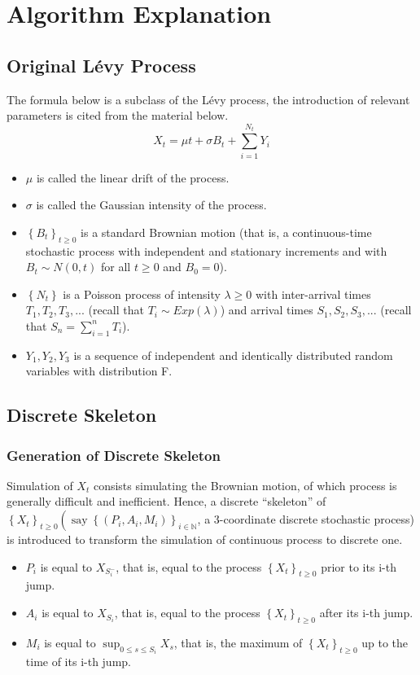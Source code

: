 \section{Algorithm Explanation}

\subsection{Original Lévy Process}
The formula below is a subclass of the Lévy process, the introduction of relevant parameters is cited from the material \cite{Brownian} below.
$$
X_{t}=\mu t+\sigma B_{t}+\sum_{i=1}^{N_{t}} Y_{i}
$$

\begin{itemize}
    \item $\mu$ is called the linear drift of the process.
    \item $\sigma$ is called the Gaussian intensity of the process.
    \item $\left\{B_{t}\right\}_{t \geq 0}$ is a standard Brownian motion (that is, a continuous-time stochastic process with independent and stationary increments and with $B_{t} \sim N(0, t)$ for all $t \geq 0$ and $B_{0}=0$).
    \item $\left\{N_{t}\right\}$ is a Poisson process of intensity $\lambda \geq 0$ with inter-arrival times $T_{1}, T_{2}, T_{3}, ...$ (recall that $T_{i} \sim E x p(\lambda)$) and arrival times $S_{1}, S_{2}, S_{3}, ...$ (recall that $S_{n} = \sum_{i=1}^{n} T_{i}$).
    \item $Y_{1}, Y_{2}, Y_{3}$ is a sequence of independent and identically distributed random variables with distribution F. 
\end{itemize}
\vspace{0.2cm}


\subsection{Discrete Skeleton}
\subsubsection{Generation of Discrete Skeleton}
Simulation of $X_{t}$ consists simulating the Brownian motion, of which process is generally difficult and inefficient. Hence, a discrete ``skeleton”\cite{Brownian} of $
\left\{X_{t}\right\}_{t \geq 0}\left(\operatorname{say}\left\{\left(P_{i}, A_{i}, M_{i}\right)\right\}_{i \in \mathbb{N}}\right.$, a 3-coordinate discrete stochastic process) is introduced to transform the simulation of continuous process to discrete one. 
\begin{itemize}
    \item $P_{i}$ is equal to $X_{S_{i}^{-}}$, that is, equal to the process $\left\{X_{t}\right\}_{t \geq 0}$ prior to its i-th jump.
    \item $A_{i}$ is equal to $X_{S_{i}}$, that is, equal to the process $\left\{X_{t}\right\}_{t \geq 0}$ after its i-th jump.
    \item $M_{i}$ is equal to $\sup _{0 \leq s \leq S_{i}} X_{s}$, that is, the maximum of $\left\{X_{t}\right\}_{t \geq 0}$ up to the time of its i-th jump.

\end{itemize}

